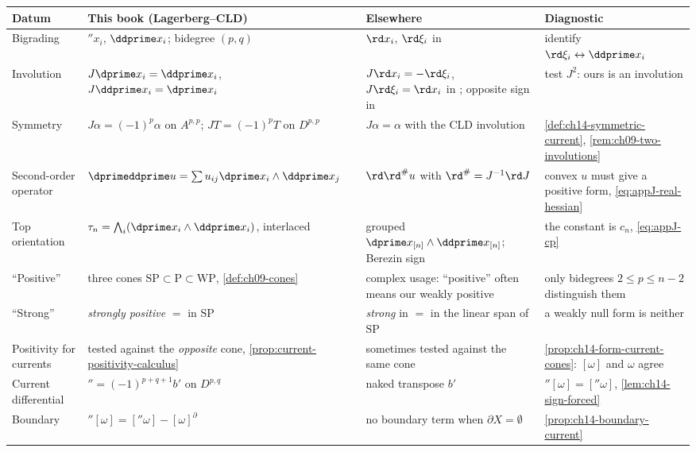 \begin{center}
\small
\begin{tabular}{@{}p{}p{}p{}p{}@{}}
\toprule
Datum & This book (Lagerberg--CLD) & Elsewhere & Diagnostic \\
\midrule
Bigrading
 & $\dprime x_i$, $\ddprime x_i$; bidegree $(p,q)$
 & $\rd x_i$, $\rd\xi_i$ in \cite{Ber19Super,Ber26Convex}
 & identify $\rd\xi_i\leftrightarrow\ddprime x_i$ \\
Involution
 & $J\dprime x_i=\ddprime x_i$, $J\ddprime x_i=\dprime x_i$
 & $J\rd x_i=-\rd\xi_i$, $J\rd\xi_i=\rd x_i$ in
   \cite[\S2]{Ber26Convex}; opposite sign in \cite{Ber19Super}
 & test $J^2$: ours is an involution \\
Symmetry
 & $J\alpha=(-1)^p\alpha$ on $A^{p,p}$; $JT=(-1)^pT$ on $D^{p,p}$
 & $J\alpha=\alpha$ with the CLD involution
 & \cref{def:ch14-symmetric-current},
   \cref{rem:ch09-two-involutions} \\
Second-order operator
 & $\dprimeddprime u=\sum u_{ij}\dprime x_i\wedge\ddprime x_j$
 & $\rd\rd^{\#}u$ with $\rd^{\#}=J^{-1}\rd J$
 & convex $u$ must give a positive form,
   \eqref{eq:appJ-real-hessian} \\
Top orientation
 & $\tau_n=\bigwedge_i(\dprime x_i\wedge\ddprime x_i)$, interlaced
 & grouped $\dprime x_{[n]}\wedge\ddprime x_{[n]}$; Berezin sign
 & the constant is $c_n$, \eqref{eq:appJ-cp} \\
``Positive''
 & three cones $\mathrm{SP}\subset\mathrm P\subset\mathrm{WP}$,
   \cref{def:ch09-cones}
 & complex usage: ``positive'' often means our weakly positive
 & only bidegrees $2\le p\le n-2$ distinguish them \\
``Strong''
 & \emph{strongly positive} $=$ in $\mathrm{SP}$
 & \emph{strong} in \cite{Ber26Convex} $=$ in the linear span of
   $\mathrm{SP}$
 & a weakly null form is neither \\
Positivity for currents
 & tested against the \emph{opposite} cone,
   \cref{prop:current-positivity-calculus}
 & sometimes tested against the same cone
 & \cref{prop:ch14-form-current-cones}: $[\omega]$ and $\omega$ agree \\
Current differential
 & $\dprime=(-1)^{p+q+1}b'$ on $D^{p,q}$
 & naked transpose $b'$
 & $\dprime[\omega]=[\dprime\omega]$,
   \cref{lem:ch14-sign-forced} \\
Boundary
 & $\dprime[\omega]=[\dprime\omega]-[\omega]^\partial$
 & no boundary term when $\partial X=\emptyset$
 & \cref{prop:ch14-boundary-current} \\

\end{tabular}
\end{center}
